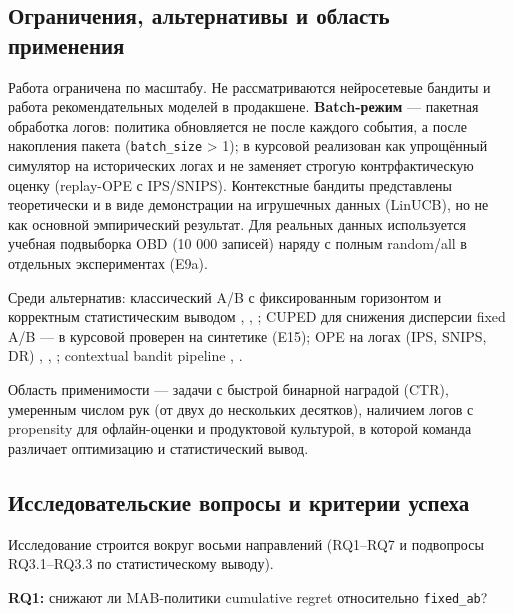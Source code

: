 \subsection{Ограничения, альтернативы и область применения}\label{ux43eux433ux440ux430ux43dux438ux447ux435ux43dux438ux44f-ux430ux43bux44cux442ux435ux440ux43dux430ux442ux438ux432ux44b-ux438-ux43eux431ux43bux430ux441ux442ux44c-ux43fux440ux438ux43cux435ux43dux435ux43dux438ux44f}

Работа ограничена по масштабу. Не рассматриваются нейросетевые бандиты и работа рекомендательных моделей в продакшене. \textbf{Batch-режим} --- пакетная обработка логов: политика обновляется не после каждого события, а после накопления пакета (\texttt{batch\_size} > 1); в курсовой реализован как упрощённый симулятор на исторических логах и не заменяет строгую контрфактическую оценку (replay-OPE с IPS/SNIPS). Контекстные бандиты представлены теоретически и в виде демонстрации на игрушечных данных (LinUCB), но не как основной эмпирический результат. Для реальных данных используется учебная подвыборка OBD (10 000 записей) наряду с полным random/all в отдельных экспериментах (E9a).

Среди альтернатив: классический A/B с фиксированным горизонтом и корректным статистическим выводом \cite{ref5}, \cite{ref19}, \cite{ref20}; CUPED для снижения дисперсии fixed A/B \cite{ref7} --- в курсовой проверен на синтетике (E15); OPE на логах (IPS, SNIPS, DR) \cite{ref6}, \cite{ref24}, \cite{ref27}; contextual bandit pipeline \cite{ref15}, \cite{ref16}.

Область применимости --- задачи с быстрой бинарной наградой (CTR), умеренным числом рук (от двух до нескольких десятков), наличием логов с propensity для офлайн-оценки и продуктовой культурой, в которой команда различает оптимизацию и статистический вывод.

\subsection{Исследовательские вопросы и критерии успеха}\label{ux438ux441ux441ux43bux435ux434ux43eux432ux430ux442ux435ux43bux44cux441ux43aux438ux435-ux432ux43eux43fux440ux43eux441ux44b-ux438-ux43aux440ux438ux442ux435ux440ux438ux438-ux443ux441ux43fux435ux445ux430}

Исследование строится вокруг восьми направлений (RQ1--RQ7 и подвопросы RQ3.1--RQ3.3 по статистическому выводу). 

\textbf{RQ1:} снижают ли MAB-политики cumulative regret относительно \texttt{fixed\_ab}? 

